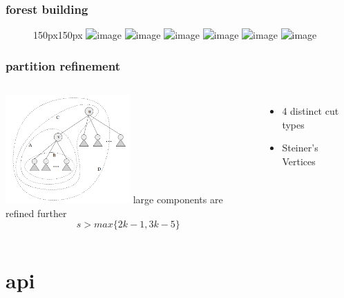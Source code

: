 \documentclass{beamer}
\begin{document}
\begin{frame}
  \frametitle{forest building}
  \begin{center}
    \begin{figure}[ht]
      \begin{overlayarea}{150px}{150px}
	\includegraphics<1>[width=140px]{../graphs/cost-graph-s0.png}
	\includegraphics<2>[width=140px]{../graphs/cost-graph-s1.png}
	\includegraphics<3>[width=140px]{../graphs/cost-graph-s2.png}
	\includegraphics<4>[width=140px]{../graphs/cost-graph-s3.png}
	\includegraphics<5>[width=140px]{../graphs/cost-graph-s4.png}  
	\includegraphics<6>[width=140px]{../graphs/cost-graph-s5.png}
      \end{overlayarea}
    \end{figure}
  \end{center}
\end{frame}

\begin{frame}
  \frametitle{partition refinement}
  \begin{columns}
  	\includegraphics[width=180px]{../images/graph-cuts.png}
  large components are refined further
  $$ s > max\{2k-1,3k-5\} $$
  \begin{itemize}
    \item 4 distinct cut types
    \item  Steiner's Vertices \cite{aggarwal}
  \end{itemize}
  \end{columns}
\end{frame}

\section{api}
\end{document}

